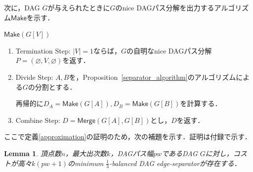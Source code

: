 \documentclass[master]{kuisthesis}		%
\theoremstyle{plain}
\newtheorem{lemma}{Lemma}
\theoremstyle{definition}
\begin{document}
次に，DAG $G$が与えられたときに$G$のnice DAGパス分解を出力するアルゴリズム$\mathsf{Make}$を示す．


$\mathsf{Make}(G[V])$
\begin{enumerate}
    \item Termination Step: $|V|=1$ならば，$G$の自明なnice DAGパス分解$P = (\varnothing, V, \varnothing)$を返す．
    \item Divide Step: $A, B$を，Proposition~\ref{separator_algorithm}のアルゴリズムによる$G$の分割とする．\par
    再帰的に$D_A = \mathsf{Make}(G[A]), D_B = \mathsf{Make}(G[B])$を計算する．
    \item Combine Step: $D = \mathsf{Merge}(G[A], G[B])$とし，$D$を返す．
\end{enumerate}


ここで定義\ref{approximation}の証明のため，次の補題を示す．証明は付録で示す．

\begin{lemma}\label{sepa_pw_relation}
    頂点数$n$，最大出次数$k$，DAGパス幅$pw$であるDAG $G$に対し，コストが高々$k(pw+1)$のminimum $\frac{1}{3}$-balanced DAG edge-separatorが存在する．
\end{lemma}

\end{document}

